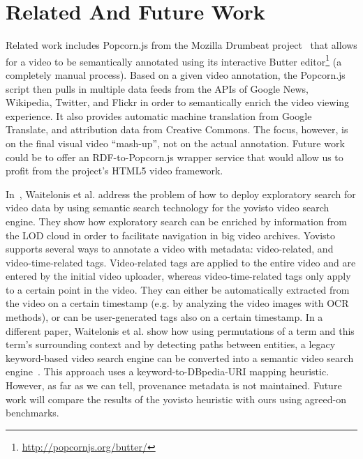 \documentclass{acm_proc_article-sp}
\begin{document}

\section{Related And Future Work}\label{sec:related}
Related work includes Popcorn.js from the Mozilla Drumbeat project~\cite{Drumbeat:Popcorn} that allows for a video to
be semantically annotated using its interactive Butter editor\footnote{\url{http://popcornjs.org/butter/}} (a
completely manual process). Based on a given video annotation, the Popcorn.js script then pulls in multiple data feeds
from the APIs of Google News, Wikipedia, Twitter, and Flickr in order to semantically enrich the video viewing
experience. It also provides automatic machine translation from Google Translate, and attribution data from Creative
Commons. The focus, however, is on the final visual video ``mash-up'', not on the actual annotation. Future work could
be to offer an RDF-to-Popcorn.js wrapper service that would allow us to profit from the project's HTML5 video
framework.

In~\cite{Sack:VideoSearch}, Waitelonis et al. address the problem of how to deploy exploratory search for video data by
using semantic search technology for the yovisto video search engine. They show how exploratory search can be enriched
by information from the LOD cloud in order to facilitate navigation in big video archives. Yovisto supports several
ways to annotate a video with metadata: video-related, and video-time-related tags. Video-related tags are applied to
the entire video and are entered by the initial video uploader, whereas video-time-related tags only apply to a certain
point in the video. They can either be automatically extracted from the video on a certain timestamp (e.g. by analyzing
the video images with OCR methods), or can be user-generated tags also on a certain timestamp. In a different paper,
Waitelonis et al. show how using permutations of a term and this term's surrounding context and by detecting paths
between entities, a legacy keyword-based video search engine can be converted into a semantic video search
engine~\cite{Sack:Use}. This approach uses a keyword-to-DBpedia-URI mapping heuristic. However, as far as we can tell,
provenance metadata is not maintained. Future work will compare the results of the yovisto heuristic with ours using
agreed-on benchmarks.
\end{document}
